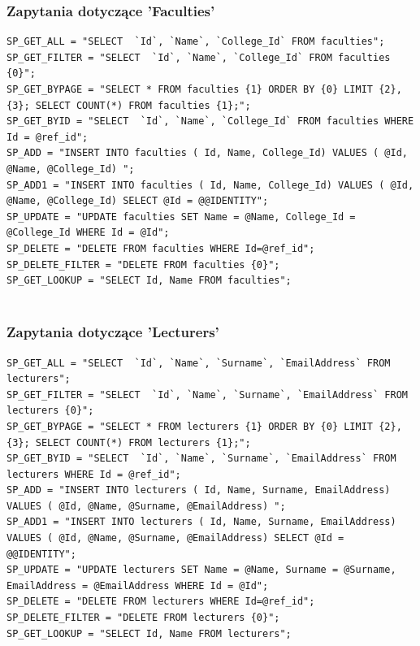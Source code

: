 \documentclass[12pt,a4paper]{article}
\begin{document}
			\subsubsection{Zapytania dotyczące 'Faculties'}
			\begin{lstlisting}
SP_GET_ALL = "SELECT  `Id`, `Name`, `College_Id` FROM faculties";
SP_GET_FILTER = "SELECT  `Id`, `Name`, `College_Id` FROM faculties {0}";
SP_GET_BYPAGE = "SELECT * FROM faculties {1} ORDER BY {0} LIMIT {2}, {3}; SELECT COUNT(*) FROM faculties {1};";
SP_GET_BYID = "SELECT  `Id`, `Name`, `College_Id` FROM faculties WHERE Id = @ref_id";
SP_ADD = "INSERT INTO faculties ( Id, Name, College_Id) VALUES ( @Id, @Name, @College_Id) ";
SP_ADD1 = "INSERT INTO faculties ( Id, Name, College_Id) VALUES ( @Id, @Name, @College_Id) SELECT @Id = @@IDENTITY";
SP_UPDATE = "UPDATE faculties SET Name = @Name, College_Id = @College_Id WHERE Id = @Id";
SP_DELETE = "DELETE FROM faculties WHERE Id=@ref_id";
SP_DELETE_FILTER = "DELETE FROM faculties {0}";
SP_GET_LOOKUP = "SELECT Id, Name FROM faculties";
			
			\end{lstlisting}
\clearpage	\subsubsection{Zapytania dotyczące 'Lecturers'}
			\begin{lstlisting}
SP_GET_ALL = "SELECT  `Id`, `Name`, `Surname`, `EmailAddress` FROM lecturers";
SP_GET_FILTER = "SELECT  `Id`, `Name`, `Surname`, `EmailAddress` FROM lecturers {0}";
SP_GET_BYPAGE = "SELECT * FROM lecturers {1} ORDER BY {0} LIMIT {2}, {3}; SELECT COUNT(*) FROM lecturers {1};";
SP_GET_BYID = "SELECT  `Id`, `Name`, `Surname`, `EmailAddress` FROM lecturers WHERE Id = @ref_id";
SP_ADD = "INSERT INTO lecturers ( Id, Name, Surname, EmailAddress) VALUES ( @Id, @Name, @Surname, @EmailAddress) ";
SP_ADD1 = "INSERT INTO lecturers ( Id, Name, Surname, EmailAddress) VALUES ( @Id, @Name, @Surname, @EmailAddress) SELECT @Id = @@IDENTITY";
SP_UPDATE = "UPDATE lecturers SET Name = @Name, Surname = @Surname, EmailAddress = @EmailAddress WHERE Id = @Id";
SP_DELETE = "DELETE FROM lecturers WHERE Id=@ref_id";
SP_DELETE_FILTER = "DELETE FROM lecturers {0}";
SP_GET_LOOKUP = "SELECT Id, Name FROM lecturers";
			
			\end{lstlisting}
\end{document}
